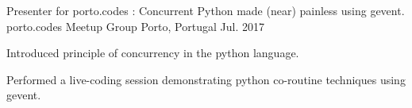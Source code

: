 \begin{cventries}

  \cventry
    {Presenter for porto.codes : Concurrent Python made (near) painless using gevent.} %
    {porto.codes Meetup Group} %
    {Porto, Portugal} %
    {Jul. 2017} %
    {
      \begin{cvitems} %
        \item {Introduced principle of concurrency in the python language.}
        \item {Performed a live-coding session demonstrating python co-routine techniques using gevent.}
      \end{cvitems}
    }


\end{cventries}
